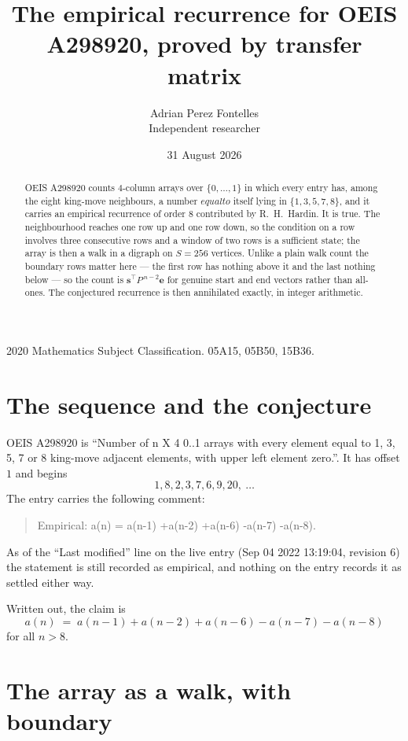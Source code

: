 \documentclass[11pt,a4paper]{article}
\title{The empirical recurrence for OEIS A298920, proved by transfer matrix}
\author{Adrian Perez Fontelles\\ \small Independent researcher}
\date{31 August 2026}
\theoremstyle{plain}
\theoremstyle{definition}
\begin{document}
\maketitle

\begin{abstract}
OEIS A298920 counts $4$-column arrays over $\{0,\dots,1\}$ in which every entry has,
among the eight king-move neighbours, a number $equal to$ itself lying in $\{1,3,5,7,8\}$, and it carries an empirical
recurrence of order $8$ contributed by R.~H.~Hardin. It is true. The neighbourhood
reaches one row up and one row down, so the condition on a row involves three consecutive
rows and a window of two rows is a sufficient state; the array is then a walk in a digraph
on $S=256$ vertices. Unlike a plain walk count the boundary rows matter here --- the first
row has nothing above it and the last nothing below --- so the count is
$\mathbf{s}^{\!\top}P^{\,n-2}\mathbf{e}$ for genuine start and end vectors rather than
all-ones. The conjectured recurrence is then annihilated exactly, in integer arithmetic.
\end{abstract}

\noindent\small 2020 Mathematics Subject Classification. 05A15, 05B50, 15B36.\normalsize

\section{The sequence and the conjecture}

OEIS A298920 is ``Number of n X 4 0..1 arrays with every element equal to 1, 3, 5, 7 or 8 king-move adjacent elements, with upper left element zero.''. It has offset
$1$ and begins
\[
1, 8, 2, 3, 7, 6, 9, 20,\ \dots
\]
The entry carries the following comment:
\begin{quote}\small
Empirical: a(n) = a(n-1) +a(n-2) +a(n-6) -a(n-7) -a(n-8).
\end{quote}
As of the ``Last modified'' line on the live entry (Sep 04 2022 13:19:04, revision
6) the statement is still recorded as empirical, and nothing on the entry
records it as settled either way.

Written out, the claim is
\begin{equation}\label{eq:conj}
a(n)\;=\;a(n-1) + a(n-2) + a(n-6) - a(n-7) - a(n-8)
\end{equation}
for all $n>8$.

\section{The array as a walk, with boundary}
\end{document}
